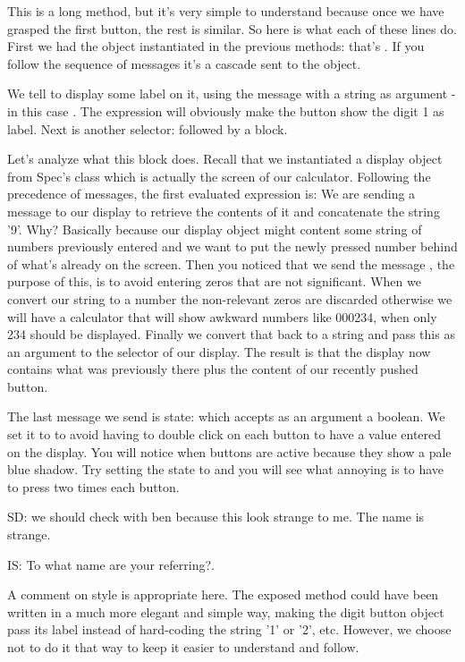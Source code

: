 \documentclass[a4paper,10pt,twoside]{book}
\begin{document}
This is a long method, but it's very simple to understand because once we have grasped the first button, the rest is similar. So here is what each of these lines do. First we had the object instantiated in the previous methods: that's . If you follow the sequence of messages it's a cascade sent to the  object.

We tell  to display some label on it, using the  message with a string as argument -in this case .  The expression  will obviously make the button show the digit 1 as label. Next is another selector:  followed by a block.

Let's analyze what this block does. Recall that we instantiated a display object from Spec's  class which is actually the screen of our calculator.
Following the precedence of messages, the first evaluated expression is: 
We are sending a message to our display to retrieve the contents of it and concatenate the string '9'. 
Why? Basically because our display object might content some string of numbers previously entered and we want to put the newly pressed number behind of what's already on the screen. 
Then you noticed that we send the message , the purpose of this, is to avoid entering zeros that are not significant. 
When we convert our string to a number the non-relevant zeros are discarded otherwise we will have a calculator that will show awkward numbers like 000234, when only 234 should be displayed. 
Finally we convert that back to a string and pass this as an argument to the  selector of our display. 
The result is that the display now contains what was previously there plus the content of our recently pushed button.

The last message we send is state: which accepts as an argument a boolean. 
We set it to  to avoid having to double click on each button to have a value entered on the display. You will notice when buttons are active because they show a pale blue shadow. Try setting the state to  and you will see what annoying is to have to press two times each button.

SD: we should check with ben because this look strange to me. The name is strange.

IS: To what name are your referring?.

A comment on style is appropriate here. The exposed method could have been written in a much more elegant and simple way, making the digit button object pass its label instead of hard-coding the string '1' or '2', etc. However, we choose not to do it that way to keep it easier to understand and follow.
\end{document}
